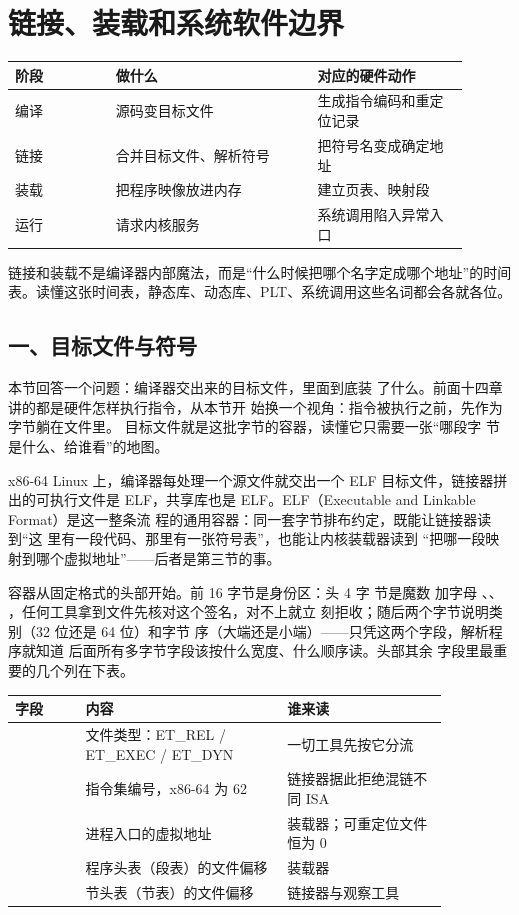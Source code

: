 \chapter{链接、装载和系统软件边界}

\begin{longtable}{L{0.2\linewidth}L{0.4\linewidth}L{0.3\linewidth}}
\toprule
阶段 & 做什么 & 对应的硬件动作 \\
\midrule
编译 & 源码变目标文件 & 生成指令编码和重定位记录 \\
链接 & 合并目标文件、解析符号 & 把符号名变成确定地址 \\
装载 & 把程序映像放进内存 & 建立页表、映射段 \\
运行 & 请求内核服务 & 系统调用陷入异常入口 \\
\bottomrule
\end{longtable}

\begin{keyidea}
链接和装载不是编译器内部魔法，而是“什么时候把哪个名字定成哪个地址”的时间表。读懂这张时间表，静态库、动态库、PLT、系统调用这些名词都会各就各位。
\end{keyidea}

\section{一、目标文件与符号}

本节回答一个问题：编译器交出来的目标文件，里面到底装
了什么。前面十四章讲的都是硬件怎样执行指令，从本节开
始换一个视角：指令被执行之前，先作为字节躺在文件里。
目标文件就是这批字节的容器，读懂它只需要一张“哪段字
节是什么、给谁看”的地图。

x86-64 Linux 上，编译器每处理一个源文件就交出一个 ELF
目标文件，链接器拼出的可执行文件是 ELF，共享库也是
ELF。ELF（Executable and Linkable Format）是这一整条流
程的通用容器：同一套字节排布约定，既能让链接器读到“这
里有一段代码、那里有一张符号表”，也能让内核装载器读到
“把哪一段映射到哪个虚拟地址”——后者是第三节的事。

容器从固定格式的头部开始。前 16 字节是身份区：头 4 字
节是魔数  加字母 、、
，任何工具拿到文件先核对这个签名，对不上就立
刻拒收；随后两个字节说明类别（32 位还是 64 位）和字节
序（大端还是小端）——只凭这两个字段，解析程序就知道
后面所有多字节字段该按什么宽度、什么顺序读。头部其余
字段里最重要的几个列在下表。

\begin{longtable}{L{0.14\linewidth}L{0.4\linewidth}L{0.32\linewidth}}
\toprule
字段 & 内容 & 谁来读 \\
\midrule
{} & 文件类型：ET\_REL / ET\_EXEC / ET\_DYN & 一切工具先按它分流 \\
 & 指令集编号，x86-64 为 62 & 链接器据此拒绝混链不同 ISA \\
 & 进程入口的虚拟地址 & 装载器；可重定位文件恒为 0 \\
 & 程序头表（段表）的文件偏移 & 装载器 \\
 & 节头表（节表）的文件偏移 & 链接器与观察工具 \\
\bottomrule
\end{longtable}

